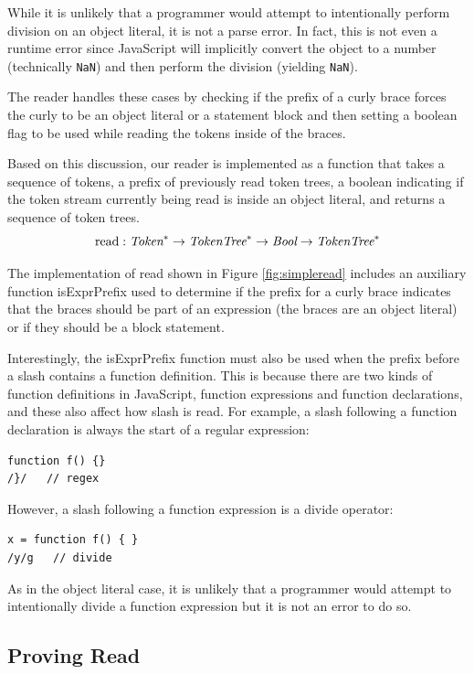 \documentclass[preprint,10pt]{sigplanconf}
\begin{document}
While it is unlikely that a programmer would attempt to intentionally
perform division on an object literal, it is not a parse error. In
fact, this is not even a runtime error since JavaScript will
implicitly convert the object to a number (technically
\verb!NaN!) and then perform the division (yielding
\verb!NaN!).

The reader handles these cases by checking if the prefix of a curly
brace forces the curly to be an object literal or a statement
block and then setting a boolean flag to be used while reading the
tokens inside of the braces.

Based on this discussion, our reader is implemented as
a function that takes a sequence of tokens, a prefix of previously read token trees, a boolean indicating if the token stream currently being read is inside an object literal, and returns a sequence of token trees.
\[
\textrm{read} : \textit{Token}^{*} \rightarrow \textit{TokenTree}^{*} 
\rightarrow \textit{Bool} \rightarrow \textit{TokenTree}^{*}
\]

The implementation of read shown in Figure \ref{fig:simpleread} includes an auxiliary function isExprPrefix used to determine if the prefix for a curly brace indicates that the braces should be part of an expression (\ie the braces are an object literal) or if they should be a block statement.

Interestingly, the isExprPrefix function must also be used when the prefix before a slash contains a function definition. This is because there are two kinds of function definitions in JavaScript, function expressions and function declarations, and these also affect how slash is read. For example, a slash following a function declaration is always the start of a regular expression:
\begin{lstlisting}
function f() {}
/}/   // regex
\end{lstlisting}
However, a slash following a function expression is a divide operator:
\begin{lstlisting}
x = function f() { } 
/y/g   // divide
\end{lstlisting}
As in the object literal case, it is unlikely that a programmer would attempt to intentionally divide a function expression but it is not an error to do so.



\subsection{Proving Read}
\label{sec:provingread}
\end{document}
